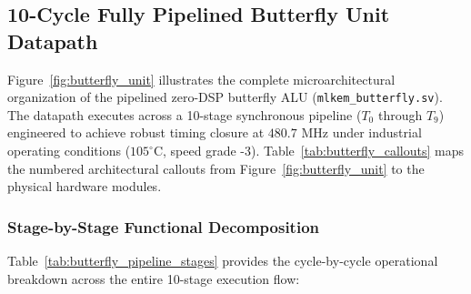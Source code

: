 \subsection{10-Cycle Fully Pipelined Butterfly Unit Datapath}
\label{sec:butterfly_pipe}

Figure~\ref{fig:butterfly_unit} illustrates the complete microarchitectural organization of the pipelined zero-DSP butterfly ALU (\texttt{mlkem\_butterfly.sv}). The datapath executes across a 10-stage synchronous pipeline ($T_0$ through $T_9$) engineered to achieve robust timing closure at $480.7\text{ MHz}$ under industrial operating conditions ($105^\circ\text{C}$, speed grade -3). Table~\ref{tab:butterfly_callouts} maps the numbered architectural callouts from Figure~\ref{fig:butterfly_unit} to the physical hardware modules.

\subsubsection{Stage-by-Stage Functional Decomposition}
Table~\ref{tab:butterfly_pipeline_stages} provides the cycle-by-cycle operational breakdown across the entire 10-stage execution flow:

